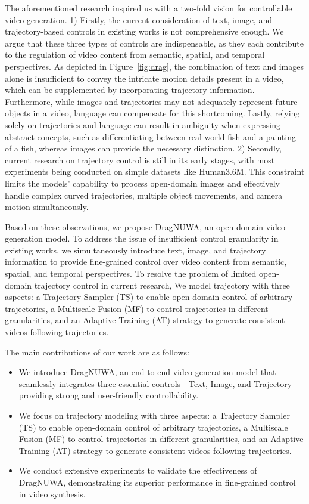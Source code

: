 \documentclass{article} %
\begin{document}
The aforementioned research inspired us with a two-fold vision for controllable video generation. 1) Firstly, the current consideration of text, image, and trajectory-based controls in existing works is not comprehensive enough. We argue that these three types of controls are indispensable, as they each contribute to the regulation of video content from semantic, spatial, and temporal perspectives. As depicted in Figure~\ref{fig:drag}, the combination of text and images alone is insufficient to convey the intricate motion details present in a video, which can be supplemented by incorporating trajectory information. Furthermore, while images and trajectories may not adequately represent future objects in a video, language can compensate for this shortcoming. Lastly, relying solely on trajectories and language can result in ambiguity when expressing abstract concepts, such as differentiating between real-world fish and a painting of a fish, whereas images can provide the necessary distinction. 2) Secondly, current research on trajectory control is still in its early stages, with most experiments being conducted on simple datasets like Human3.6M. This constraint limits the models' capability to process open-domain images and effectively handle complex curved trajectories, multiple object movements, and camera motion simultaneously.


Based on these observations, we propose DragNUWA, an open-domain video generation model. To address the issue of insufficient control granularity in existing works, we simultaneously introduce text, image, and trajectory information to provide fine-grained control over video content from semantic, spatial, and temporal perspectives. To resolve the problem of limited open-domain trajectory control in current research, We model trajectory with three aspects: a Trajectory Sampler (TS) to enable open-domain control of arbitrary trajectories, a Multiscale Fusion (MF) to control trajectories in different granularities, and an Adaptive Training (AT) strategy to generate consistent videos following trajectories.

The main contributions of our work are as follows:

\begin{itemize}
    \item We introduce DragNUWA, an end-to-end video generation model that seamlessly integrates three essential controls—Text, Image, and Trajectory—providing strong and user-friendly controllability.
    \item We focus on trajectory modeling with three aspects: a Trajectory Sampler (TS) to enable open-domain control of arbitrary trajectories, a Multiscale Fusion (MF) to control trajectories in different granularities, and an Adaptive Training (AT) strategy to generate consistent videos following trajectories.
    \item We conduct extensive experiments to validate the effectiveness of DragNUWA, demonstrating its superior performance in fine-grained control in video synthesis.

\end{itemize}
\end{document}
